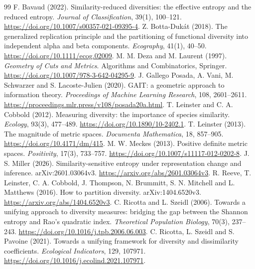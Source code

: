 \documentclass[11pt,a4paper]{article}
\theoremstyle{remark}
\begin{document}
\begin{thebibliography}{99}
 F. Bavaud (2022). Similarity-reduced diversities: the effective entropy and the reduced entropy. \emph{Journal of Classification}, 39(1), 100--121. \url{https://doi.org/10.1007/s00357-021-09395-4}.
 Z. Botta-Duk\'at (2018). The generalized replication principle and the partitioning of functional diversity into independent alpha and beta components. \emph{Ecography}, 41(1), 40--50. \url{https://doi.org/10.1111/ecog.02009}.
 M. M. Deza and M. Laurent (1997). \emph{Geometry of Cuts and Metrics}. Algorithms and Combinatorics, Springer. \url{https://doi.org/10.1007/978-3-642-04295-9}.
 J. Gallego Posada, A. Vani, M. Schwarzer and S. Lacoste-Julien (2020). GAIT: a geometric approach to information theory. \emph{Proceedings of Machine Learning Research}, 108, 2601--2611. \url{https://proceedings.mlr.press/v108/posada20a.html}.
 T. Leinster and C. A. Cobbold (2012). Measuring diversity: the importance of species similarity. \emph{Ecology}, 93(3), 477--489. \url{https://doi.org/10.1890/10-2402.1}.
 T. Leinster (2013). The magnitude of metric spaces. \emph{Documenta Mathematica}, 18, 857--905. \url{https://doi.org/10.4171/dm/415}.
 M. W. Meckes (2013). Positive definite metric spaces. \emph{Positivity}, 17(3), 733--757. \url{https://doi.org/10.1007/s11117-012-0202-8}.
 J. S. Miller (2026). Similarity-sensitive entropy under representation change and inference. arXiv:2601.03064v3. \url{https://arxiv.org/abs/2601.03064v3}.
 R. Reeve, T. Leinster, C. A. Cobbold, J. Thompson, N. Brummitt, S. N. Mitchell and L. Matthews (2016). How to partition diversity. arXiv:1404.6520v3. \url{https://arxiv.org/abs/1404.6520v3}.
 C. Ricotta and L. Szeidl (2006). Towards a unifying approach to diversity measures: bridging the gap between the Shannon entropy and Rao's quadratic index. \emph{Theoretical Population Biology}, 70(3), 237--243. \url{https://doi.org/10.1016/j.tpb.2006.06.003}.
 C. Ricotta, L. Szeidl and S. Pavoine (2021). Towards a unifying framework for diversity and dissimilarity coefficients. \emph{Ecological Indicators}, 129, 107971. \url{https://doi.org/10.1016/j.ecolind.2021.107971}.
\end{thebibliography}
\end{document}
